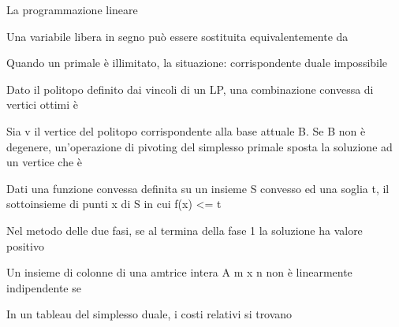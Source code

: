 \documentclass[answers, a4paper, 11pt]{exam}
\begin{document}
\begin{questions}
\begin{solution}
\end{solution}

\question La programmazione lineare
\begin{solution}

\end{solution}

\question Una variabile libera in segno può essere sostituita equivalentemente da
\begin{solution}

\end{solution}

\question Quando un primale è illimitato, la situazione: corrispondente duale impossibile
\begin{solution}

\end{solution}

\question Dato il politopo definito dai vincoli di un LP, una combinazione convessa di vertici ottimi è
\begin{solution}

\end{solution}

\question Sia v il vertice del politopo corrispondente alla base attuale B. Se B non è degenere, un'operazione di pivoting del simplesso primale sposta la soluzione ad un vertice che è
\begin{solution}

\end{solution}

\question Dati una funzione convessa definita su un insieme S convesso ed una soglia t, il sottoinsieme di punti x di S in cui f(x) <= t
\begin{solution}

\end{solution}

\question Nel metodo delle due fasi, se al termina della fase 1 la soluzione ha valore positivo
\begin{solution}

\end{solution}

\question Un insieme di colonne di una amtrice intera A m x n non è linearmente indipendente se
\begin{solution}

\end{solution}

\question In un tableau del simplesso duale, i costi relativi si trovano
\begin{solution}


\end{solution}
\end{questions}
\end{document}
